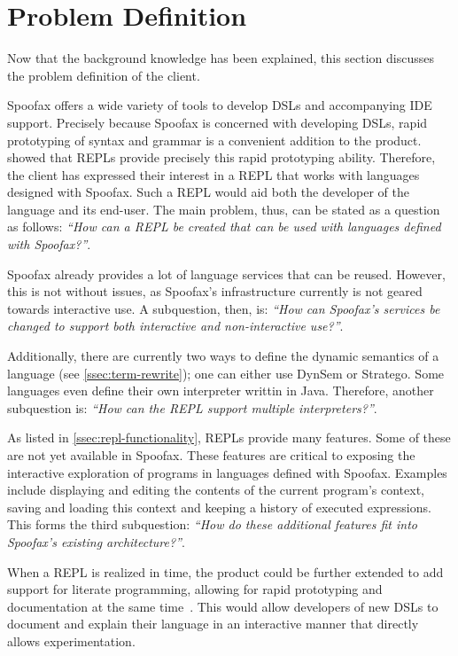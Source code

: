 \section{Problem Definition}
\label{sec:problem-definition}

Now that the background knowledge has been explained, this section discusses the
problem definition of the client.

Spoofax offers a wide variety of tools to develop DSLs and accompanying IDE
support. Precisely because Spoofax is concerned with developing DSLs, rapid
prototyping of syntax and grammar is a convenient addition to the product.
 showed that REPLs provide precisely this rapid prototyping
ability.  Therefore, the client has expressed their interest in a REPL that
works with languages designed with Spoofax. Such a REPL would aid both the
developer of the language and its end-user. The main problem, thus, can be
stated as a question as follows: \textit{``How can a REPL be created that can be
used with languages defined with Spoofax?''}.

Spoofax already provides a lot of language services that can be reused. However,
this is not without issues, as Spoofax's infrastructure currently is not geared
towards interactive use. A subquestion, then, is: \textit{``How can Spoofax's
services be changed to support both interactive and non-interactive use?''}.

Additionally, there are currently two ways to define the dynamic semantics of a
language (see \cref{ssec:term-rewrite}); one can either use DynSem or Stratego.
Some languages even define their own interpreter writtin in Java. Therefore,
another subquestion is: \textit{``How can the REPL support multiple
interpreters?''}.

As listed in \cref{ssec:repl-functionality}, REPLs provide many features. Some
of these are not yet available in Spoofax. These features are critical to
exposing the interactive exploration of programs in languages defined with
Spoofax. Examples include displaying and editing the contents of the current
program's context, saving and loading this context and keeping a history of
executed expressions. This forms the third subquestion: \textit{``How do these
additional features fit into Spoofax's existing architecture?''}.

When a REPL is realized in time, the product could be further extended to add
support for literate programming, allowing for rapid prototyping and
documentation at the same time~\cite{schulte2012}. This would allow
developers of new DSLs to document and explain their language in an
interactive manner that directly allows experimentation.

